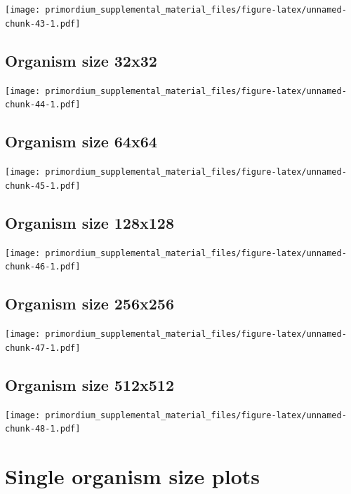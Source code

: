 \documentclass[]{book}
\begin{document}
\texttt{[image: primordium\_supplemental\_material\_files/figure-latex/unnamed-chunk-43-1.pdf]}

\hypertarget{organism-size-32x32-1}{%
\subsection{Organism size 32x32}\label{organism-size-32x32-1}}

\texttt{[image: primordium\_supplemental\_material\_files/figure-latex/unnamed-chunk-44-1.pdf]}

\hypertarget{organism-size-64x64-1}{%
\subsection{Organism size 64x64}\label{organism-size-64x64-1}}

\texttt{[image: primordium\_supplemental\_material\_files/figure-latex/unnamed-chunk-45-1.pdf]}

\hypertarget{organism-size-128x128-1}{%
\subsection{Organism size 128x128}\label{organism-size-128x128-1}}

\texttt{[image: primordium\_supplemental\_material\_files/figure-latex/unnamed-chunk-46-1.pdf]}

\hypertarget{organism-size-256x256-1}{%
\subsection{Organism size 256x256}\label{organism-size-256x256-1}}

\texttt{[image: primordium\_supplemental\_material\_files/figure-latex/unnamed-chunk-47-1.pdf]}

\hypertarget{organism-size-512x512-1}{%
\subsection{Organism size 512x512}\label{organism-size-512x512-1}}

\texttt{[image: primordium\_supplemental\_material\_files/figure-latex/unnamed-chunk-48-1.pdf]}

\hypertarget{single-organism-size-plots-2}{%
\section{Single organism size plots}\label{single-organism-size-plots-2}}
\end{document}
